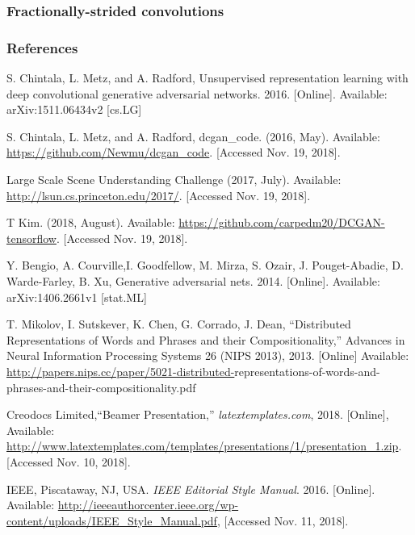 \documentclass{beamer}
\begin{document}

\begin{frame}
\frametitle{Fractionally-strided convolutions}

\end{frame}


\begin{frame}[allowframebreaks]
\frametitle{References}
\footnotesize{
\begin{thebibliography}{99} %

 S. Chintala, L. Metz, and A. Radford, 
Unsupervised representation learning with deep convolutional generative 
adversarial networks.  2016. [Online]. Available: arXiv:1511.06434v2 [cs.LG]

 S. Chintala, L. Metz, and A. Radford, dcgan\_code. (2016,
May).  Available: \url{https://github.com/Newmu/dcgan\_code}. [Accessed Nov. 19,
2018].

 Large Scale Scene Understanding Challenge (2017, July).
Available: \url{http://lsun.cs.princeton.edu/2017/}. [Accessed Nov. 19, 2018].

 T Kim. (2018, August).  Available: \url{https://github.com/carpedm20/DCGAN-tensorflow}. [Accessed Nov. 19, 2018].


 Y. Bengio, A. Courville,I. Goodfellow, M. Mirza, S. Ozair,  
J. Pouget-Abadie,  D. Warde-Farley, B. Xu, Generative adversarial nets. 2014. 
[Online]. Available: arXiv:1406.2661v1 [stat.ML]

 T. Mikolov, I. Sutskever, K. Chen, G. Corrado, J. Dean,
``Distributed Representations of Words and Phrases and their Compositionality,''
Advances in Neural Information Processing Systems 26 (NIPS 2013), 2013. 
[Online] Available: \url{http://papers.nips.cc/paper/5021-distributed-}representations-of-words-and-phrases-and-their-compositionality.pdf

 Creodocs Limited,``Beamer Presentation,''
\emph{latextemplates.com}, 2018. [Online], Available: 
\url{http://www.latextemplates.com/templates/presentations/1/presentation\_1.zip}. [Accessed Nov. 10, 2018].

 IEEE, Piscataway, NJ, USA. \emph{IEEE Editorial Style Manual}. 2016.
[Online]. Available: \url{http://ieeeauthorcenter.ieee.org/wp-content/uploads/IEEE\_Style_Manual.pdf}, [Accessed Nov. 11, 2018].


\end{thebibliography}}
\end{frame}
\end{document}
